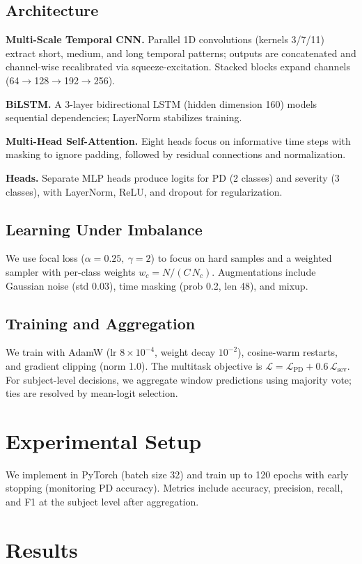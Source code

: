 \documentclass[conference]{IEEEtran}
\begin{document}
\subsection{Architecture}
\textbf{Multi-Scale Temporal CNN.} Parallel 1D convolutions (kernels 3/7/11) extract short, medium, and long temporal patterns; outputs are concatenated and channel-wise recalibrated via squeeze-excitation. Stacked blocks expand channels (64$\rightarrow$128$\rightarrow$192$\rightarrow$256).

\textbf{BiLSTM.} A 3-layer bidirectional LSTM (hidden dimension 160) models sequential dependencies; LayerNorm stabilizes training.

\textbf{Multi-Head Self-Attention.} Eight heads focus on informative time steps with masking to ignore padding, followed by residual connections and normalization.

\textbf{Heads.} Separate MLP heads produce logits for PD (2 classes) and severity (3 classes), with LayerNorm, ReLU, and dropout for regularization.

\subsection{Learning Under Imbalance}
We use focal loss (\(\alpha=0.25,\ \gamma=2\)) to focus on hard samples and a weighted sampler with per-class weights \(w_c = N/(C\,N_c)\). Augmentations include Gaussian noise (std 0.03), time masking (prob 0.2, len 48), and mixup.

\subsection{Training and Aggregation}
We train with AdamW (lr $8\times10^{-4}$, weight decay $10^{-2}$), cosine-warm restarts, and gradient clipping (norm 1.0). The multitask objective is \(\mathcal{L}=\mathcal{L}_{\mathrm{PD}} + 0.6\,\mathcal{L}_{\mathrm{sev}}\). For subject-level decisions, we aggregate window predictions using majority vote; ties are resolved by mean-logit selection.

\section{Experimental Setup}
We implement in PyTorch (batch size 32) and train up to 120 epochs with early stopping (monitoring PD accuracy). Metrics include accuracy, precision, recall, and F1 at the subject level after aggregation.

\section{Results}
\end{document}
